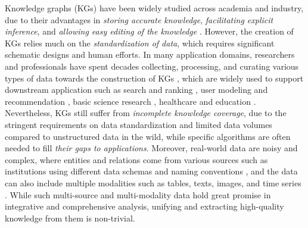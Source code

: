 Knowledge graphs (KGs) have been widely studied across academia and industry, due to their advantages in {\textit{storing accurate knowledge}, \textit{facilitating explicit inference}, and \textit{allowing easy editing of the knowledge} \cite{hogan2021knowledge, ji2021survey, wang2017knowledge, zou2020survey}}.
{However, the creation of KGs relies much on the \textit{standardization of data}, which requires significant schematic designs and human efforts.}
In many application domains, researchers and professionals have spent decades collecting, processing, and curating various types of data towards the construction of KGs \cite{cui2023review, su2023biomedical, cornet2008forty, santos2020clinical, harrison2021icd, lipscomb2000medical, bodenreider2004unified, xu2020building, li2020real, lv2023tcmbank}, which are widely used to support downstream application such as search and ranking \cite{xiong2017explicit, liu2018entity, vu2019capsule}, user modeling and recommendation \cite{wang2019kgat, wang2021learning, yang2022knowledge}, basic science research \cite{feng2023genomickb, shao2022knowledge, quan2023aimedgraph, zhang2021discovering, li2022prediction, jeong2022intelligent}, healthcare \cite{xu2023seqcare,jiang2024graphcare,xu2024ram} and education \cite{chen2018knowedu, rizun2019knowledge}. 
{Nevertheless, KGs still suffer from \textit{incomplete knowledge coverage}, due to the stringent requirements on data standardization and limited data volumes compared to unstructured data in the wild, while specific algorithms are often needed to fill \textit{their gaps to applications}}.
Moreover, real-world data are noisy and complex, where entities and relations come from various sources such as institutions using different data schemas and naming conventions \cite{tang2022intelligent, yuan2012multi, zhang2010multi}, and the data can also include multiple modalities such as tables, texts, images, and time series \cite{huang2021makes, baltruvsaitis2018multimodal, acosta2022multimodal, cai2019survey, zhang2022m3care, soenksen2022integrated, shaik2023survey, krones2024review, cremonesi2023need, iakovidis2012semantic, kline2022multimodal, stahlschmidt2022multimodal}. 
While such multi-source and multi-modality data hold great promise in integrative and comprehensive analysis, unifying and extracting high-quality knowledge from them is non-trivial.

